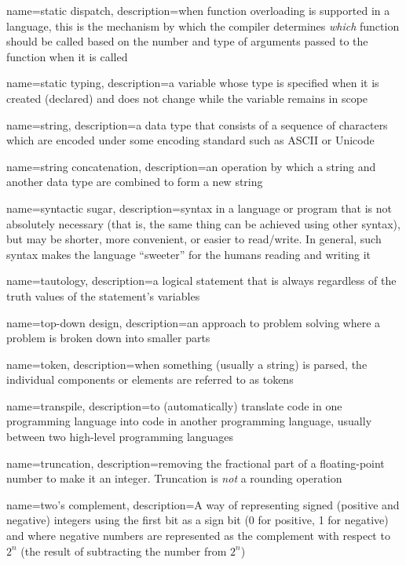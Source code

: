 {
  name=static dispatch,
  description={when function overloading is supported in a language, this is the mechanism by which the compiler determines \emph{which} function should be called based on the number and type of arguments passed to the function when it is called}
}

{
  name=static typing,
  description={a variable whose type is specified when it is created (declared) and does not change while the
  	variable remains in scope}
}

{
  name=string,
  description={a data type that consists of a sequence of characters which are encoded under some encoding standard such as ASCII or Unicode}
}

{
  name=string concatenation,
  description={an operation by which a string and another data type are combined to form a new string}
}

{
  name=syntactic sugar,
  description={syntax in a language or program that is not absolutely necessary (that is, the
  	same thing can be achieved using other syntax), but may be shorter, more convenient, or
	easier to read/write.  In general, such syntax makes the language ``sweeter'' for the
	humans reading and writing it}
}

{
  name=tautology,
  description={a logical statement that is always \True regardless of the truth values of the statement's variables}
}

{
  name=top-down design,
  description={an approach to problem solving where a problem is broken down into smaller parts}
}

{
  name=token,
  description={when something (usually a string) is parsed, the individual components or elements are referred to as tokens}
}

{
  name=transpile,
  description={to (automatically) translate code in one programming language into code in another programming language, usually between two high-level programming languages}
}

{
  name=truncation,
  description={removing the fractional part of a floating-point number to make it an integer.  Truncation is \emph{not} a 
  	rounding operation}
}

{
  name=two's complement,
  description={A way of representing signed (positive and negative) integers using the first bit as a sign bit (0 for positive, 1 for negative) and where negative numbers are represented as the complement with respect to $2^n$ (the result of subtracting the number from $2^n$) }
}

